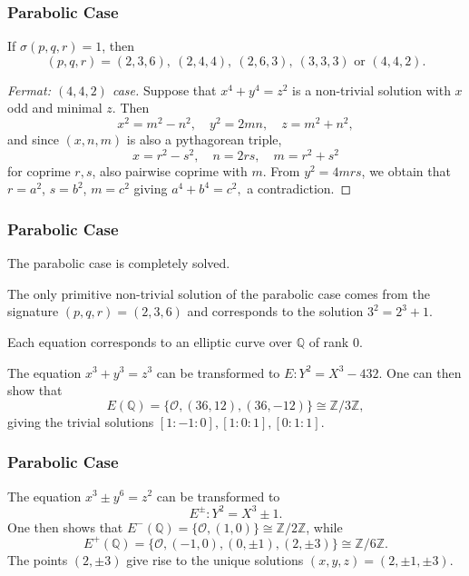 \documentclass{beamer}
\newcommand{\QQ}{\mathbb{Q}}
\newcommand{\ZZ}{\mathbb{Z}}
\theoremstyle{plain}
\begin{document}
\begin{frame}
    \frametitle{Parabolic Case}
    If $\sigma(p,q,r)=1$, then $$(p,q,r)=(2,3,6),\ (2,4,4),\ (2,6,3),\ (3,3,3)\text{ or }(4,4,2).$$
    
    \begin{proof}[Fermat: $(4,4,2)$ case]
        Suppose that $x^4+y^4=z^2$ is a non-trivial solution with $x$ odd and minimal $z$. Then 
        $$x^2=m^2-n^2,\quad y^2=2mn,\quad z=m^2+n^2,$$
        and since $(x,n,m)$ is also a pythagorean triple,
        $$x=r^2-s^2,\quad n=2rs,\quad m=r^2+s^2$$
        for coprime $r,s$, also pairwise coprime with $m$. From $y^2=4mrs$, we obtain that $r=a^2$, $s=b^2$, $m=c^2$ giving $a^4+b^4=c^2,$ a contradiction.
    \end{proof}

\end{frame}


\begin{frame}
    \frametitle{Parabolic Case}
    The parabolic case is completely solved.
    \begin{theorem}
        The only primitive non-trivial solution of the parabolic case comes from the signature $(p,q,r)=(2,3,6)$ and corresponds to the solution $3^2=2^3+1$.
    \end{theorem}
    Each equation corresponds to an elliptic curve over $\QQ$ of rank $0$.
    \begin{example}[Signature $(3,3,3)$]
        The equation $x^3+y^3=z^3$ can be transformed to $E:Y^2=X^3-432.$ %
        One can then show that 
        $$E(\QQ)=\{\mathcal{O},(36,12),(36,-12)\}\cong\ZZ/3\ZZ,$$
        giving the trivial solutions $[1:-1:0], [1:0:1], [0:1:1]$.
    \end{example}
\end{frame}

\begin{frame}
    \frametitle{Parabolic Case}
    \begin{example}
        The equation $x^3\pm y^6=z^2$ can be transformed to $$E^{\pm}:Y^2=X^3\pm1.$$ One then shows that $E^-(\QQ)=\{\mathcal{O},(1,0)\}\cong\ZZ/2\ZZ$, while
        $$E^+(\QQ)=\{\mathcal{O},(-1,0),(0,\pm1),(2,\pm 3)\}\cong\ZZ/6\ZZ.$$
        The points $(2,\pm 3)$ give rise to the unique solutions $(x,y,z)=(2,\pm1,\pm3)$.
    \end{example}
\end{frame}
\end{document}
